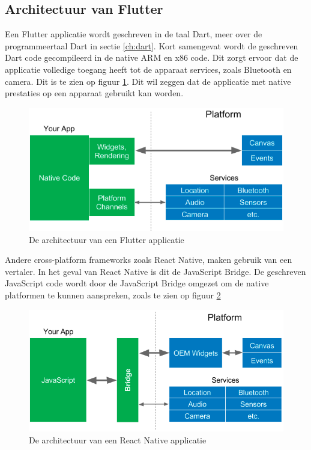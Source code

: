 \subsection{Architectuur van Flutter}
Een Flutter applicatie wordt geschreven in de taal Dart, meer over de programmeertaal Dart in sectie \ref{ch:dart}. Kort samengevat wordt de geschreven Dart code gecompileerd in de native ARM en x86 code. 
Dit zorgt ervoor dat de applicatie volledige toegang heeft tot de apparaat services, zoals Bluetooth en camera. Dit is te zien op figuur \ref{fig:flutter-app-architecture}.
Dit wil zeggen dat de applicatie met native prestaties op een apparaat gebruikt kan worden.

\begin{figure}[H]
    \centering
    \includegraphics[width=\figureWidthModifier\linewidth]{img/stand-van-zaken/flutter-app-architecture.png}
    \caption{De architectuur van een Flutter applicatie \autocite{Leler2017}}
    \label{fig:flutter-app-architecture}
\end{figure}

Andere cross-platform frameworks zoals React Native, maken gebruik van een vertaler. In het geval van React Native is dit de JavaScript Bridge. De geschreven JavaScript code wordt door de JavaScript Bridge omgezet om de native platformen te kunnen aanspreken, zoals te zien op figuur \ref{fig:react-native-app-architecture}  \autocite{Kuitunen2019}

\begin{figure}[H]
    \centering
    \includegraphics[width=\figureWidthModifier\linewidth]{img/stand-van-zaken/react-native-app-architecture.png}
    \caption{De architectuur van een React Native applicatie \autocite{Leler2017}}
    \label{fig:react-native-app-architecture}
\end{figure}

